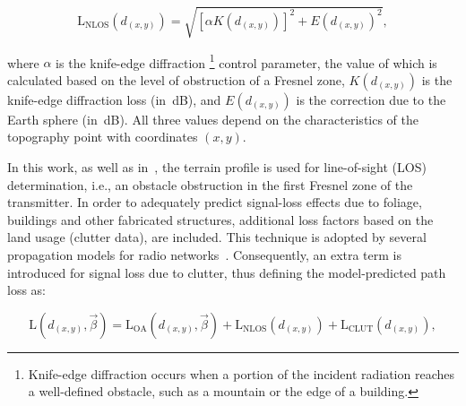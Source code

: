 \begin{equation}
\mathrm{L}{}_{\mathrm{NLOS}}(d_{(x,y)})=\sqrt{\left[\alpha K(d_{(x,y)})\right]^{2}+E(d_{(x,y)})^{2}},\label{eq:04-Hata_NLOS}
\end{equation}


\noindent {}

\noindent where $\alpha$ is the knife-edge diffraction%
\footnote{\noindent Knife-edge diffraction occurs when a portion of the incident
radiation reaches a well-defined obstacle, such as a mountain or the
edge of a building.%
} control parameter, the value of which is calculated based on the
level of obstruction of a Fresnel zone, $K(d_{(x,y)})$ is the knife-edge
diffraction loss (in~dB), and $E(d_{(x,y)})$ is the correction due
to the Earth sphere (in~dB). All three values depend on the characteristics
of the topography point with coordinates $(x,y)$.

In this work, as well as in~\cite{Filiposka_Terrain_aware_three_dimensional_radio_propagation_model_extension_for_NS2:2011},
the terrain profile is used for line-of-sight (LOS)
determination, i.e., an obstacle obstruction in the first Fresnel
zone of the transmitter. In order to adequately predict signal-loss
effects due to foliage, buildings and other fabricated structures,
additional loss factors based on the land usage (clutter data), are
included. This technique is adopted by several propagation models
for radio networks~\cite{Aarnaes-Tuning_of_empirical_radio_propagation_models_effect_of_location_accuracy:2004,Begovic_Applicability_evaluation_of_Okumura_Ericsson_and_Winner_propagation_models_for_coverage_planning:2012,Neskovic_Microcell_electric_field_strength_prediction_model:2010}.
Consequently, an extra term is introduced for signal loss due to clutter,
thus defining the model-predicted path loss as:

\begin{equation}
\mathrm{L}(d_{(x,y)},\vec{\beta})=\mathrm{L}{}_{\mathrm{OA}}(d_{(x,y)},\vec{\beta})+\mathrm{L}_{\mathrm{NLOS}}(d_{(x,y)})+\mathrm{L}{}_{\mathrm{CLUT}}(d_{(x,y)}),\label{eq:04-Hata_pathloss}
\end{equation}


\noindent {}

